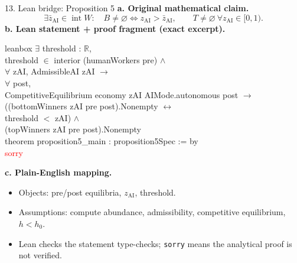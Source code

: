 \documentclass[aspectratio=169,11pt]{beamer}
\newcommand{\zAI}{z_{\mathrm{AI}}}
\newcommand{\zbAI}{\bar z_{\mathrm{AI}}}
\begin{document}
\begin{frame}[fragile]{13. Lean bridge: Proposition 5}
  \textbf{a. Original mathematical claim.}\\[-2mm]
  \[
    \exists\zbAI\in\operatorname{int}W:\quad
    B\neq\varnothing\iff\zAI>\zbAI,\qquad
    T\neq\varnothing\ \forall\zAI\in[0,1).
  \]
  \vspace{-2mm}
  \textbf{b. Lean statement + proof fragment (exact excerpt).}\\[-1mm]
  \begin{beamercolorbox}[sep=.35em,wd=\textwidth]{leanbox}
  {\scriptsize\ttfamily
  $\exists$ threshold : $\mathbb R$,\\
  \hspace*{1em}threshold $\in$ interior (humanWorkers pre) $\land$\\
  \hspace*{1em}$\forall$ zAI, AdmissibleAI zAI $\to$\\
  \hspace*{2em}$\forall$ post,\\
  \hspace*{3em}CompetitiveEquilibrium economy zAI AIMode.autonomous post $\to$\\
  \hspace*{4em}((bottomWinners zAI pre post).Nonempty $\leftrightarrow$\\
  \hspace*{6em}threshold $<$ zAI) $\land$\\
  \hspace*{5em}(topWinners zAI pre post).Nonempty\\[.6mm]
  theorem proposition5\_main : proposition5Spec := by\\
  \hspace*{1em}\textcolor{red}{sorry}
  }
  \end{beamercolorbox}

  \textbf{c. Plain-English mapping.}\\[-1mm]
  \begin{itemize}\scriptsize
    \setlength{\itemsep}{0pt}
    \setlength{\parskip}{0pt}
    \item Objects: pre/post equilibria, $\zAI$, threshold.
    \item Assumptions: compute abundance, admissibility, competitive equilibrium, $h<h_0$.
    \item Lean checks the statement type-checks; \texttt{sorry} means the analytical proof is not verified.
  \end{itemize}
\end{frame}
\end{document}
